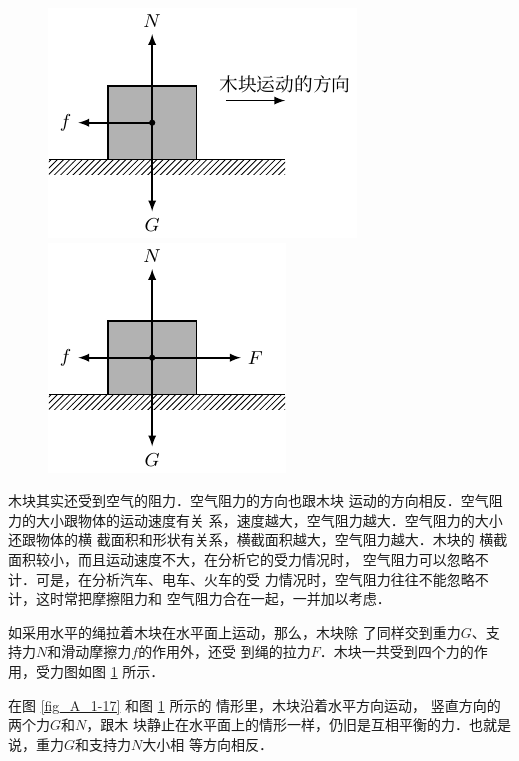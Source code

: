 \begin{figure} [htp]\centering
	\begin{minipage} [t]{0.48\textwidth} 
		\centering
		\includegraphics{fig/A/1-17.pdf} 
		\caption{} \label{fig_A_1-17} 
	\end{minipage} 
	\begin{minipage} [t]{0.48\textwidth} 
		\centering
		\includegraphics{fig/A/1-18.pdf} 
		\caption{} \label{fig_A_1-18} 
	\end{minipage} 
\end{figure} 

    木块其实还受到空气的阻力．空气阻力的方向也跟木块
运动的方向相反．空气阻力的大小跟物体的运动速度有关
系，速度越大，空气阻力越大．空气阻力的大小还跟物体的横
截面积和形状有关系，横截面积越大，空气阻力越大．木块的
横截面积较小，而且运动速度不大，在分析它的受力情况时，
空气阻力可以忽略不计．可是，在分析汽车、电车、火车的受
力情况时，空气阻力往往不能忽略不计，这时常把摩擦阻力和
空气阻力合在一起，一并加以考虑．

    如采用水平的绳拉着木块在水平面上运动，那么，木块除
了同样交到重力$G$、支持力$N$和滑动摩擦力$f$的作用外，还受
到绳的拉力$F$．木块一共受到四个力的作用，受力图如图 \ref{fig_A_1-18} 所示．

    在图 \ref{fig_A_1-17} 和图 \ref{fig_A_1-18} 所示的
情形里，木块沿着水平方向运动，
竖直方向的两个力$G$和$N$，跟木
块静止在水平面上的情形一样，仍旧是互相平衡的力．也就是说，重力$G$和支持力$N$大小相
等方向相反．


